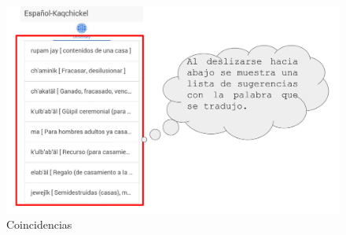 \documentclass[landscape,12pt]{article}
\begin{document}
\newpage
\begin{figure}[htb]
	  \centering
	\includegraphics[width=18cm]{ml_4}
	\caption{Coincidencias}
	\label{fig:ml4}
\end{figure}
\newpage
\end{document}
